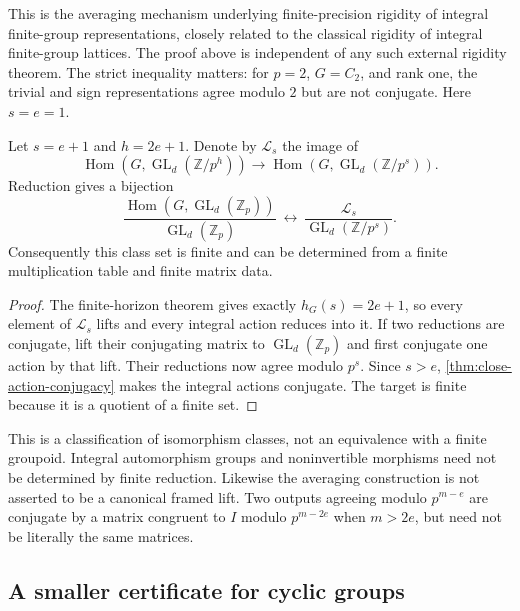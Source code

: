 This is the averaging mechanism underlying finite-precision rigidity of integral finite-group representations, closely related to the classical rigidity of integral finite-group lattices. The proof above is independent of any such external rigidity theorem. The strict inequality matters: for $p=2$, $G=C_2$, and rank one, the trivial and sign representations agree modulo $2$ but are not conjugate. Here $s=e=1$.

\begin{corollary}\label{cor:finite-action-catalogue}
Let $s=e+1$ and $h=2e+1$. Denote by $\mathscr L_s$ the image of
\[
 \operatorname{Hom}(G,\operatorname{GL}_d(\mathbb Z/p^h))
 \longrightarrow
 \operatorname{Hom}(G,\operatorname{GL}_d(\mathbb Z/p^s)).
\]
Reduction gives a bijection
\[
 \boxed{
 \frac{\operatorname{Hom}(G,\operatorname{GL}_d(\mathbb Z_p))}
 {\operatorname{GL}_d(\mathbb Z_p)}
 \ \longleftrightarrow\
 \frac{\mathscr L_s}{\operatorname{GL}_d(\mathbb Z/p^s)}.}
\]
Consequently this class set is finite and can be determined from a finite multiplication table and finite matrix data.
\end{corollary}
\begin{proof}
The finite-horizon theorem gives exactly $h_G(s)=2e+1$, so every element of $\mathscr L_s$ lifts and every integral action reduces into it. If two reductions are conjugate, lift their conjugating matrix to $\operatorname{GL}_d(\mathbb Z_p)$ and first conjugate one action by that lift. Their reductions now agree modulo $p^s$. Since $s>e$, \cref{thm:close-action-conjugacy} makes the integral actions conjugate. The target is finite because it is a quotient of a finite set.
\end{proof}

This is a classification of isomorphism classes, not an equivalence with a finite groupoid. Integral automorphism groups and noninvertible morphisms need not be determined by finite reduction. Likewise the averaging construction is not asserted to be a canonical framed lift. Two outputs agreeing modulo $p^{m-e}$ are conjugate by a matrix congruent to $I$ modulo $p^{m-2e}$ when $m>2e$, but need not be literally the same matrices.

\subsection{A smaller certificate for cyclic groups}

